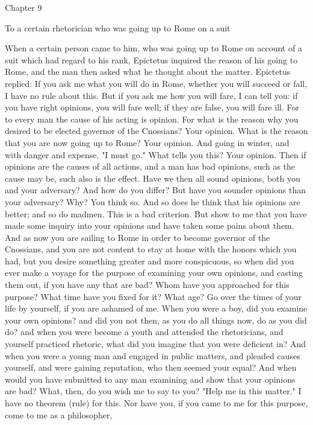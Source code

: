\documentclass[a4paper]{article}
\begin{document}
Chapter 9

To a certain rhetorician who was going up to Rome on a suit

    When a certain person came to him, who was going up to Rome on account of a
suit which had regard to his rank, Epictetus inquired the reason of his going
to Rome, and the man then asked what he thought about the matter. Epictetus
replied: If you ask me what you will do in Rome, whether you will succeed or
fall, I have no rule about this. But if you ask me how you will fare, I can
tell you: if you have right opinions, you will fare well; if they are false,
you will fare ill. For to every man the cause of his acting is opinion. For
what is the reason why you desired to be elected governor of the Cnossians?
Your opinion. What is the reason that you are now going up to Rome? Your
opinion. And going in winter, and with danger and expense. "I must go." What
tells you this? Your opinion. Then if opinions are the causes of all actions,
and a man has bad opinions, such as the cause may be, such also is the effect.
Have we then all sound opinions, both you and your adversary? And how do you
differ? But have you sounder opinions than your adversary? Why? You think so.
And so does he think that his opinions are better; and so do madmen. This is a
bad criterion. But show to me that you have made some inquiry into your
opinions and have taken some pains about them. And as now you are sailing to
Rome in order to become governor of the Cnossians, and you are not content to
stay at home with the honors which you had, but you desire something greater
and more conspicuous, so when did you ever make a voyage for the purpose of
examining your own opinions, and casting them out, if you have any that are
bad? Whom have you approached for this purpose? What time have you fixed for
it? What age? Go over the times of your life by yourself, if you are ashamed of
me. When you were a boy, did you examine your own opinions? and did you not
then, as you do all things now, do as you did do? and when you were become a
youth and attended the rhetoricians, and yourself practiced rhetoric, what did
you imagine that you were deficient in? And when you were a young man and
engaged in public matters, and pleaded causes yourself, and were gaining
reputation, who then seemed your equal? And when would you have submitted to
any man examining and show that your opinions are bad? What, then, do you wish
me to say to you? "Help me in this matter." I have no theorem (rule) for this.
Nor have you, if you came to me for this purpose, come to me as a philosopher,
\end{document}
